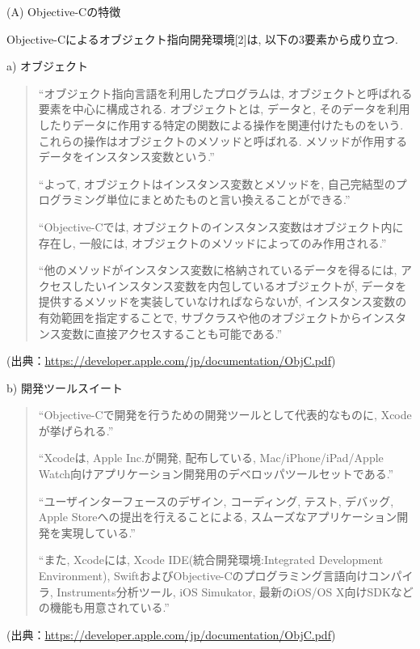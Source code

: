 \begin{description}
\item (A) Objective-Cの特徴

Objective-Cによるオブジェクト指向開発環境[2]は, 以下の3要素から成り立つ.

\begin{description}
\item a) オブジェクト

\begin{quotation}
“オブジェクト指向言語を利用したプログラムは, オブジェクトと呼ばれる要素を中心に構成される.
オブジェクトとは, データと, そのデータを利用したりデータに作用する特定の関数による操作を関連付けたものをいう.
これらの操作はオブジェクトのメソッドと呼ばれる.
メソッドが作用するデータをインスタンス変数という.”

“よって, オブジェクトはインスタンス変数とメソッドを, 自己完結型のプログラミング単位にまとめたものと言い換えることができる.”

“Objective-Cでは, オブジェクトのインスタンス変数はオブジェクト内に存在し, 一般には, オブジェクトのメソッドによってのみ作用される.”

“他のメソッドがインスタンス変数に格納されているデータを得るには, アクセスしたいインスタンス変数を内包しているオブジェクトが, データを提供するメソッドを実装していなければならないが, インスタンス変数の有効範囲を指定することで, サブクラスや他のオブジェクトからインスタンス変数に直接アクセスすることも可能である.”
\end{quotation}
\begin{flushright}
(出典：\url{https://developer.apple.com/jp/documentation/ObjC.pdf})
\end{flushright}

\item b) 開発ツールスイート

\begin{quotation}
“Objective-Cで開発を行うための開発ツールとして代表的なものに, Xcodeが挙げられる.”

“Xcodeは, Apple Inc.が開発, 配布している, Mac/iPhone/iPad/Apple Watch向けアプリケーション開発用のデベロッパツールセットである.”

“ユーザインターフェースのデザイン, コーディング, テスト, デバッグ, Apple Storeへの提出を行えることによる, スムーズなアプリケーション開発を実現している.”

“また, Xcodeには, Xcode IDE(統合開発環境:Integrated Development Environment), SwiftおよびObjective-Cのプログラミング言語向けコンパイラ, Instruments分析ツール, iOS Simukator, 最新のiOS/OS X向けSDKなどの機能も用意されている.”
\end{quotation}
\begin{flushright}
(出典：\url{https://developer.apple.com/jp/documentation/ObjC.pdf})
\end{flushright}


\end{description}
\end{description}
